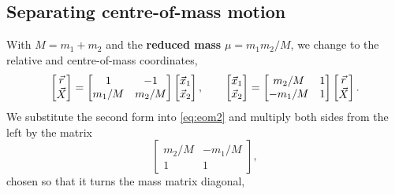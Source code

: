 	\subsection{Separating centre-of-mass motion}
	\label{sec:com_separation}
	With $M=m_1+m_2$ and the \textbf{reduced mass} $\mu = m_1m_2/M$, we change to the relative and centre-of-mass coordinates,
	\[
	\begin{bmatrix}\vec r\\ \vec X\end{bmatrix}=\begin{bmatrix}1&-1\\ m_1/M& m_2/M\end{bmatrix}\begin{bmatrix}\vec x_1\\\vec x_2\end{bmatrix},
	\qquad
	\begin{bmatrix}\vec x_1\\\vec x_2\end{bmatrix}=\begin{bmatrix}m_2/M&1\\-m_1/M&1\end{bmatrix}\begin{bmatrix}\vec r\\\vec X\end{bmatrix}.
	\]
	We substitute the second form into \eqref{eq:eom2} and multiply both sides from the left by the matrix
	\[
	\begin{bmatrix}m_2/M&-m_1/M\\1&1\end{bmatrix},
	\]
	chosen so that it turns the mass matrix diagonal,
